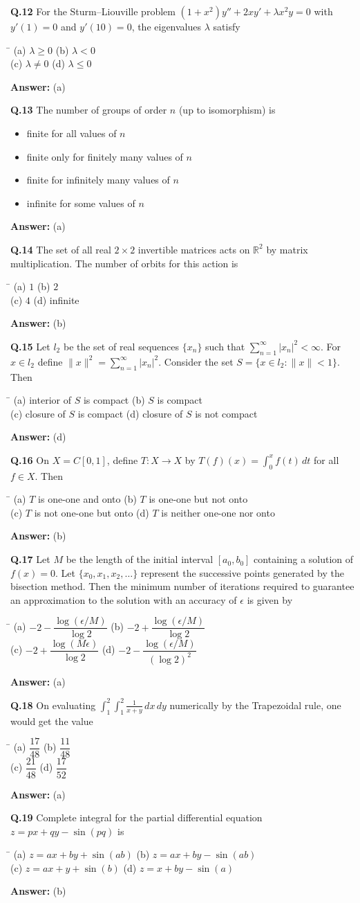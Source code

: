\documentclass[11pt,a4paper]{article}
\newcommand{\optsfour}[4]{%
  \begin{tabbing}
    \hspace{0.48\linewidth}\=\kill
    (a) #1 \> (b) #2 \\[2pt]
    (c) #3 \> (d) #4
  \end{tabbing}%
}
\newcommand{\optslist}[4]{%
  \begin{itemize}
    \setlength{\itemsep}{2pt}\setlength{\parskip}{0pt}
    \item[(a)] #1
    \item[(b)] #2
    \item[(c)] #3
    \item[(d)] #4
  \end{itemize}%
}
\newcommand{\ans}[1]{\textbf{Answer:} #1\par\medskip}
\begin{document}
\textbf{Q.12} For the Sturm--Liouville problem $(1 + x^2)y'' + 2xy' + \lambda x^2 y = 0$ with $y'(1) = 0$ and $y'(10) = 0$, the eigenvalues $\lambda$ satisfy
\optsfour{$\lambda \ge 0$}{$\lambda < 0$}{$\lambda \ne 0$}{$\lambda \le 0$}
\ans{(a)}

\textbf{Q.13} The number of groups of order $n$ (up to isomorphism) is
\optslist{finite for all values of $n$}{finite only for finitely many values of $n$}{finite for infinitely many values of $n$}{infinite for some values of $n$}
\ans{(a)}

\textbf{Q.14} The set of all real $2 \times 2$ invertible matrices acts on $\mathbb{R}^2$ by matrix multiplication. The number of orbits for this action is
\optsfour{$1$}{$2$}{$4$}{infinite}
\ans{(b)}

\textbf{Q.15} Let $l_2$ be the set of real sequences $\{x_n\}$ such that $\sum_{n=1}^{\infty} |x_n|^2 < \infty$. For $x \in l_2$ define $\|x\|^2 = \sum_{n=1}^{\infty} |x_n|^2$. Consider the set $S = \{x \in l_2 : \|x\| < 1\}$. Then
\optsfour{interior of $S$ is compact}{$S$ is compact}{closure of $S$ is compact}{closure of $S$ is not compact}
\ans{(d)}

\textbf{Q.16} On $X = C[0,1]$, define $T : X \to X$ by $T(f)(x) = \displaystyle\int_0^x f(t)\,dt$ for all $f \in X$. Then
\optsfour{$T$ is one-one and onto}{$T$ is one-one but not onto}{$T$ is not one-one but onto}{$T$ is neither one-one nor onto}
\ans{(b)}

\textbf{Q.17} Let $M$ be the length of the initial interval $[a_0, b_0]$ containing a solution of $f(x) = 0$. Let $\{x_0, x_1, x_2, \dots\}$ represent the successive points generated by the bisection method. Then the minimum number of iterations required to guarantee an approximation to the solution with an accuracy of $\epsilon$ is given by
\optsfour{$-2 - \dfrac{\log(\epsilon/M)}{\log 2}$}{$-2 + \dfrac{\log(\epsilon/M)}{\log 2}$}{$-2 + \dfrac{\log(M\epsilon)}{\log 2}$}{$-2 - \dfrac{\log(\epsilon/M)}{(\log 2)^2}$}
\ans{(a)}

\textbf{Q.18} On evaluating $\displaystyle\int_1^2 \int_1^2 \frac{1}{x + y}\,dx\,dy$ numerically by the Trapezoidal rule, one would get the value
\optsfour{$\dfrac{17}{48}$}{$\dfrac{11}{48}$}{$\dfrac{21}{48}$}{$\dfrac{17}{52}$}
\ans{(a)}

\textbf{Q.19} Complete integral for the partial differential equation $z = px + qy - \sin(pq)$ is
\optsfour{$z = ax + by + \sin(ab)$}{$z = ax + by - \sin(ab)$}{$z = ax + y + \sin(b)$}{$z = x + by - \sin(a)$}
\ans{(b)}
\end{document}
